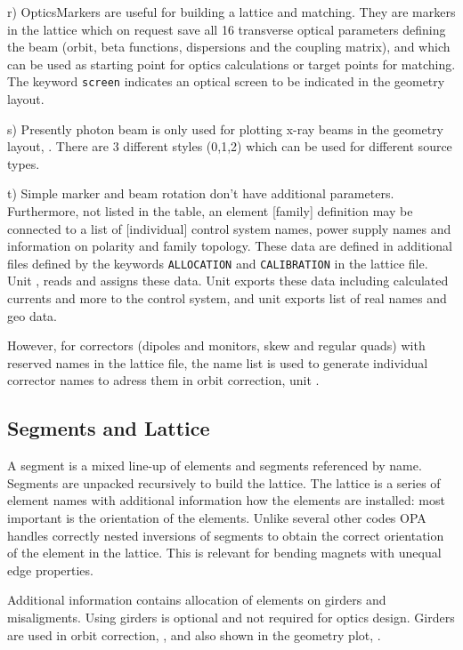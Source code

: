 \documentclass[12pt]{article}
\newcommand\code[1]{{\tt #1}}
\newcommand{\opagui}[1]{\colorbox{blue!20}{{\color{black}\code{#1}}}}
\newcommand{\ogui}[1]{\hyperref[#1]{\opagui{#1}}}
\newcommand{\opauni}[1]{\colorbox{orange!30}{{\color{black}\code{#1}}}}
\newcommand{\ouni}[1]{\hyperref[#1]{\opauni{#1}}}
\newcommand{\feature}[1]{{\color{cadmiumgreen} #1}}
\begin{document}
r) OpticsMarkers are useful for building a lattice and matching. They are markers in the lattice which on request save all 16 transverse optical parameters defining the beam (orbit, beta functions, dispersions and the coupling matrix), and which can be used as starting point for optics calculations or target points for matching. The keyword {\tt screen} indicates an optical screen to be indicated in the geometry layout.

s) Presently photon beam is only used for plotting x-ray beams in the geometry layout, \ogui{opageometry}. There are 3 different styles (0,1,2) which can be used for different source types.

t) Simple marker and beam rotation don't have additional parameters.\\


\label{namelist}Furthermore, not listed in the table, an element [family] definition may be connected to a list of [individual] control system names, power supply names and information on polarity and family topology. These data are defined in additional files defined by the keywords {\tt ALLOCATION} and {\tt CALIBRATION} in the lattice file. Unit \ouni{latfilelib}, reads and assigns these data. Unit \ogui{opacurrents} exports these data including calculated currents and more to the control system, and unit \ogui{opageometry} exports list of real names and geo data.

However, for correctors (dipoles and monitors, skew and regular quads) with reserved names in the lattice file, the name list is used to generate individual corrector names to adress them in orbit correction, unit \ogui{opaorbit}.


\subsection{Segments and Lattice}
A segment is a mixed line-up of elements and segments referenced by name. Segments are unpacked recursively to build the lattice. The lattice is a series of element names with additional information how the elements are installed: most important is the orientation of the elements. 
\feature{Unlike several other codes OPA handles correctly nested inversions of segments to obtain the correct orientation of the element in the lattice. This is relevant for bending magnets with unequal edge properties.}

Additional information contains allocation of elements on girders and misaligments. Using girders is optional and not required for optics design. Girders are used in orbit correction, \ogui{opaorbit}, and also shown in the geometry plot, \ogui{opageometry}.
\end{document}
